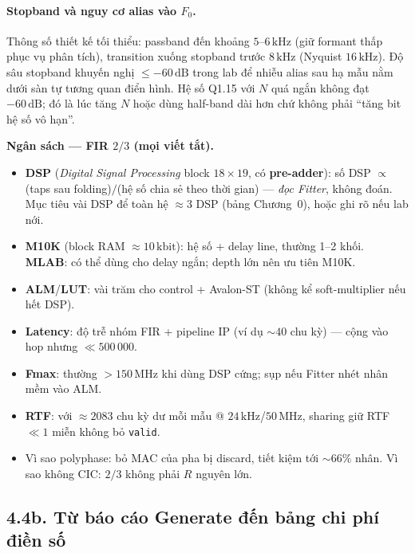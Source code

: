 \paragraph{Stopband và nguy cơ alias vào $F_0$.} Thông số thiết kế tối thiểu: passband đến khoảng $5$--$6\,\text{kHz}$ (giữ formant thấp phục vụ phân tích), transition xuống stopband trước $8\,\text{kHz}$ (Nyquist $16\,\text{kHz}$). Độ sâu stopband khuyến nghị $\le -60\,\text{dB}$ trong lab để nhiễu alias sau hạ mẫu nằm dưới sàn tự tương quan điển hình. Hệ số Q1.15 với $N$ quá ngắn không đạt $-60\,\text{dB}$; đó là lúc tăng $N$ hoặc dùng half-band dài hơn chứ không phải ``tăng bit hệ số vô hạn''.

\begin{costbox}
\textbf{Ngân sách --- FIR $2/3$ (mọi viết tắt).}
\begin{itemize}[leftmargin=1.2em]
\item \textbf{DSP} (\emph{Digital Signal Processing} block $18\times 19$, có \textbf{pre-adder}): số DSP $\propto$ (taps sau folding)${}/{}$(hệ số chia sẻ theo thời gian) --- \emph{đọc Fitter}, không đoán. Mục tiêu vài DSP để toàn hệ $\approx 3$ DSP (bảng Chương~0), hoặc ghi rõ nếu lab nới.
\item \textbf{M10K} (block RAM $\approx 10\,\text{kbit}$): hệ số + delay line, thường 1--2 khối. \textbf{MLAB}: có thể dùng cho delay ngắn; depth lớn nên ưu tiên M10K.
\item \textbf{ALM}/\textbf{LUT}: vài trăm cho control + Avalon-ST (không kể soft-multiplier nếu hết DSP).
\item \textbf{Latency}: độ trễ nhóm FIR + pipeline IP (ví dụ $\sim 40$ chu kỳ) --- cộng vào hop nhưng $\ll 500\,000$.
\item \textbf{Fmax}: thường $>150\,\text{MHz}$ khi dùng DSP cứng; sụp nếu Fitter nhét nhân mềm vào ALM.
\item \textbf{RTF}: với $\approx 2083$ chu kỳ dư mỗi mẫu @ $24\,\text{kHz}$/$50\,\text{MHz}$, sharing giữ RTF$\ll 1$ miễn không bỏ \texttt{valid}.
\item Vì sao polyphase: bỏ MAC của pha bị discard, tiết kiệm tới $\sim 66\%$ nhân. Vì sao không CIC: $2/3$ không phải $R$ nguyên lớn.
\end{itemize}
\end{costbox}


\subsection*{4.4b. Từ báo cáo Generate đến bảng chi phí điền số}

